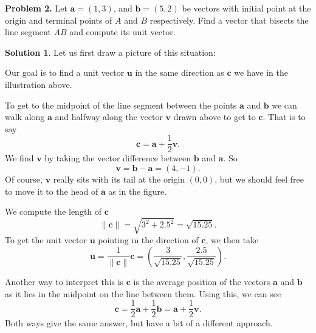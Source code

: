 \documentclass[12pt]{report} %
\theoremstyle{definition}
\newtheorem{solution}{Solution}
\begin{document}
\noindent\textbf{Problem 2.} Let $\textbf{a}=(1,3)$, and $\textbf{b}=(5,2)$ be vectors with initial point at the origin and terminal points of $A$ and $B$ respectively. Find a vector that bisects the line segment $AB$ and compute its unit vector.
\begin{solution}
Let us first draw a picture of this situation:
        \begin{center}
        \end{center}
        Our goal is to find a unit vector $\mathbf{u}$ in the same direction as $\mathbf{c}$ we have in the illustration above.  
        
        To get to the midpoint of the line segment between the points $\mathbf{a}$ and $\mathbf{b}$ we can walk along $\mathbf{a}$ and halfway along the vector $\mathbf{v}$ drawn above to get to $\mathbf{c}$.  That is to say
        \[
        \mathbf{c}=\mathbf{a}+\frac{1}{2}\mathbf{v}.
        \]
        We find $\mathbf{v}$ by taking the vector difference between $\mathbf{b}$ and $\mathbf{a}$.  So
        \[
        \mathbf{v}=\mathbf{b}-\mathbf{a}=(4,-1).
        \]
        Of course, $\mathbf{v}$ really sits with its tail at the origin $(0,0)$, but we should feel free to move it to the head of $\mathbf{a}$ as in the figure.
        
        We compute the length of $\mathbf{c}$
        \[
        \|\mathbf{c}\|=\sqrt{3^2+2.5^2}=\sqrt{15.25}. 
        \]
        To get the unit vector $\mathbf{u}$ pointing in the direction of $\mathbf{c}$, we then take
        \[
        \mathbf{u}=\frac{1}{\|\mathbf{c}\|}\mathbf{c}=\left( \frac{3}{\sqrt{15.25}},\frac{2.5}{\sqrt{15.25}}\right).
        \]
        
        Another way to interpret this is $\mathbf{c}$ is the average position of the vectors $\mathbf{a}$ and $\mathbf{b}$ as it lies in the midpoint on the line between them.  Using this, we can see
        \[
        \mathbf{c}=\frac{1}{2}\mathbf{a}+\frac{1}{2}\mathbf{b}=\mathbf{a}+\frac{1}{2}\mathbf{v}.
        \]
        Both ways give the same answer, but have a bit of a different approach.  
\end{solution}
\hspace{.5cm}
\end{document}
